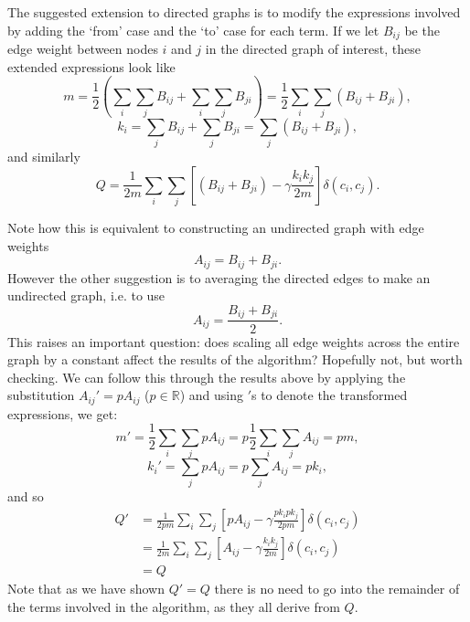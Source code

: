 \documentclass{article}
\begin{document}
The suggested extension to directed graphs is to modify the expressions 
involved by adding the `from' case and the `to' case for each term. 
If we let $B_{ij}$ be the edge weight between nodes $i$ and $j$ in 
the directed graph of interest, these extended expressions look like
\begin{equation}
m = \frac{1}{2}\left ( \sum_i\sum_jB_{ij} + \sum_i\sum_jB_{ji}\right)  = \frac{1}{2}\sum_i\sum_j \left( B_{ij} + B_{ji} \right) ,
\end{equation}
\begin{equation}
k_i = \sum_jB_{ij} + \sum_jB_{ji} = \sum_j{\left( B_{ij} + B_{ji} \right)},
\end{equation}
and similarly
\begin{equation}
	Q = \frac{1}{2m}\sum_i\sum_j\left[ \left( B_{ij} + B_{ji} \right) - \gamma \frac{k_ik_j}{2m} \right] \delta(c_i,c_j).
\end{equation}

Note how this is equivalent to constructing an undirected graph with
edge weights
\begin{equation}
A_{ij} = B_{ij} + B_{ji}.
\end{equation}
However the other suggestion is to averaging the directed edges to make
an undirected graph, i.e. to use
\begin{equation}
A_{ij} = \frac{B_{ij} + B_{ji}}{2}.
\end{equation}
This raises an important question: does scaling all edge weights across 
the entire graph by a constant affect the results of the algorithm?
Hopefully not, but worth checking.
We can follow this through the results above by applying the 
substitution $A_{ij}' = pA_{ij}$ ($p \in \mathbb{R}$) and using ${}'$s
to denote the transformed expressions, we get:
\begin{equation}
m' = \frac{1}{2}\sum_i\sum_jpA_{ij}  = p\frac{1}{2}\sum_i\sum_j A_{ij} = pm ,
\end{equation}
\begin{equation}
k_i' = \sum_j{pA_{ij}} = p\sum_j{A_{ij}} = pk_i,
\end{equation}
and so
\begin{align*}
	Q' &= \frac{1}{2pm}\sum_i\sum_j\left[ pA_{ij} - \gamma \frac{pk_ipk_j}{2pm} \right] \delta(c_i,c_j) \\
	&= \frac{1}{2m}\sum_i\sum_j\left[ A_{ij} - \gamma \frac{k_ik_j}{2m} \right] \delta(c_i,c_j) \\
	&= Q
\end{align*}
Note that as we have shown $Q' = Q$ there is no need to go into the remainder of the terms 
involved in the algorithm, as they all derive from $Q$.
\end{document}
